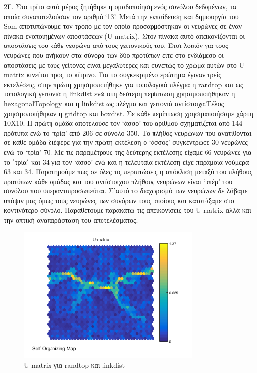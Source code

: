 \documentclass[12pt]{article}
\begin{document}
2Γ. 	Στο τρίτο αυτό μέρος ζητήθηκε η ομαδοποίηση ενός συνόλου δεδομένων, τα οποία συναποτελούσαν τον αριθμό `13'. Μετά την εκπαίδευση και δημιουργία του Som αποτυπώνουμε τον τρόπο με τον οποίο προσαρμόστηκαν οι νευρώνες σε έναν πίνακα ενοποιημένων αποστάσεων (U-matrix).  Στον πίνακα αυτό απεικονίζονται οι αποστάσεις του κάθε νευρώνα από τους γειτονικούς του. Έτσι λοιπόν για τους νευρώνες που ανήκουν στα σύνορα των δύο προτύπων είτε στο ενδιάμεσο οι αποστάσεις με τους γείτονες είναι μεγαλύτερες και συνεπώς το χρώμα αυτών στο U-matrix κινείται προς το κίτρινο. Για το συγκεκριμένο ερώτημα έγιναν τρείς εκτελέσεις, στην πρώτη χρησιμοποιήθηκε για τοπολογικό πλέγμα η randtop και ως τοπολογική γειτονιά η linkdist ενώ στη δεύτερη περίπτωση χρησιμοποιήθηκαν η hexagonalTopology και η linkdist ως πλέγμα και γειτονιά αντίστοιχα.Τέλος χρησιμοποιήθηκαν η gridtop και boxdist. Σε κάθε περίπτωση χρησιμοποιήσαμε χάρτη 10Χ10. H πρώτη ομάδα αποτελούσε τον `άσσο' του αριθμού σχηματίζεται από 144 πρότυπα ενώ το `τρία' από 206 σε σύνολο 350. Το πλήθος νευρώνων που ανατίθονται σε κάθε ομάδα διέφερε για την πρώτη εκτέλεση ο `άσσος' συγκέντρωσε 30 νευρώνες ενώ το `τρία' 70. Με τις παραμέτρους της δεύτερης εκτέλεσης είχαμε 66 νευρώνες για το ΄τρία΄ και 34 για τον `ἀσσο' ενώ και η τελευταία εκτέλεση είχε παράμοια νούμερα 63 και 34. Παρατηρούμε πως σε όλες τις περιπτώσεις η απόκλιση μεταξύ του πλήθους προτύπων κάθε ομάδας και του αντίστοιχου πλήθους νευρώνων είναι `υπέρ' του συνόλου που υπεραντιπροσωπεύται. Σ'αυτό το διαχωρισμό των νευρώνων δε λάβαμε υπόψιν μας όμως τους νευρώνες των συνόρων τους οποίους και κατατάξαμε στο κοντινότερο σύνολο. Παραθέτουμε παρακάτω τις απεικονίσεις του U-matrix αλλά και την οπτική αναπαράσταση του αποτελέσματος.
		\begin{figure}[H]
	 		\centering
			\includegraphics[width=0.8\textwidth]{fakelos/u-matrix.png}
			\caption{U-matrix για randtop και linkdist} 	  
			\label{fig:2}
		\end{figure} 		  
\end{document}
